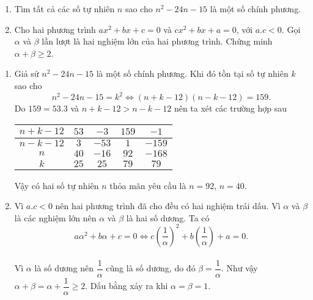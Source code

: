	\begin{ex}%
		\hfill
		\begin{enumerate}    
			\item Tìm tất cả các số tự nhiên $n$ sao cho $n^2-24n-15$ là một số chính phương.
			\item Cho hai phương trình $ax^2+bx+c=0$ và $cx^2+bx+a=0$, với $a.c<0$. Gọi $\alpha $ và $\beta $ lần lượt là hai nghiệm lớn của hai phương trình. Chứng minh $\alpha + \beta \ge2$.
		\end{enumerate}
		\loigiai
		{
			\begin{enumerate}
				\item  Giả sử $n^2-24n-15$ là một số chính phương. 
				Khi đó tồn tại số tự nhiên $k$ sao cho 
				$$n^2-24n-15=k^2\Leftrightarrow \left( n+k-12 \right)\left( n-k-12 \right)=159.$$
				Do $159=53.3$ và $n+k-12>n-k-12$ nên ta xét các trường hợp sau
				\begin{center}
					\begin{tabular}{|l|l|l|l|l|}
						\hline
						\multicolumn{1}{|c|}{$n+k-12$} & \multicolumn{1}{c|}{$53$} & \multicolumn{1}{c|}{$-3$} & \multicolumn{1}{c|}{$159$} & \multicolumn{1}{c|}{$-1$} \\ 
						\hline
						\multicolumn{1}{|c|}{$n-k-12$} & \multicolumn{1}{c|}{$3$} & \multicolumn{1}{c|}{$-53$} & \multicolumn{1}{c|}{$1$} & \multicolumn{1}{c|}{$-159$} \\ 
						\hline
						\multicolumn{1}{|c|}{$n$} & \multicolumn{1}{c|}{$40$} & \multicolumn{1}{c|}{$-16$} & \multicolumn{1}{c|}{$92$} & \multicolumn{1}{c|}{$-168$} \\ 
						\hline
						\multicolumn{1}{|c|}{$k$} & \multicolumn{1}{c|}{$25$} & \multicolumn{1}{c|}{$25$} & \multicolumn{1}{c|}{$79$} & \multicolumn{1}{c|}{$79$} \\ 
						\hline
					\end{tabular}   
				\end{center}
				Vậy có hai số tự nhiên $n$ thỏa mãn yêu cầu là $n=92$, $n=40$.
				\item Vì $a.c< 0$ nên hai phương trình đã cho đều có hai nghiệm trái dấu.
				Vì $\alpha$ và $\beta$ là các nghiệm lớn nên $\alpha $ và $\beta $ là hai số dương.
				Ta có 
				$$a\alpha^2+  b\alpha + c=0 \Leftrightarrow c\left(\dfrac{1}{\alpha } \right)^2+ b\left( \dfrac{1}{\alpha } \right)+a=0.$$\\
				Vì $\alpha$ là số dương nên $\dfrac{1}{\alpha}$ cũng là số dương, do đó  $\beta =\dfrac{1}{\alpha }$. Như vậy
				$\alpha +\beta = \alpha + \dfrac{1}{\alpha }\ge 2$. Dấu bằng xảy ra khi $\alpha =\beta=1$.
			\end{enumerate}
		}
	\end{ex}
	
